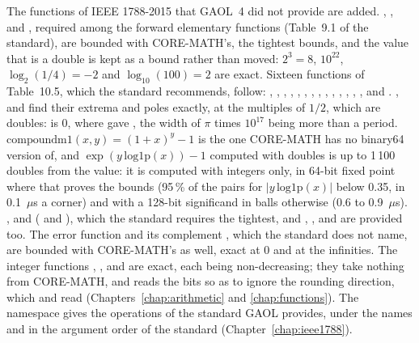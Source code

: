 \medskip
The functions of IEEE 1788-2015 that GAOL~4 did not provide are
added.\newinvfive{} , ,  and ,
required among the forward elementary functions (Table~9.1 of the standard),
are bounded with CORE-MATH's, the tightest bounds, and the value that is a
double is kept as a bound rather than moved: $2^3 = 8$, $10^{22}$,
$\log_2(1/4) = -2$ and $\log_{10}(100) = 2$ are exact. Sixteen functions of
Table~10.5, which the standard recommends, follow: ,
, , , , ,
, , , , ,
, , ,  and
. ,  and  find their
extrema and poles exactly, at the multiples of $1/2$, which are doubles:
 is 0, where  gave , the
width of $\pi$ times $10^{17}$ being more than a period.
$\mathrm{compoundm1}(x, y) = (1 + x)^y - 1$ is the one CORE-MATH has no
binary64 version of, and $\exp(y\,\mathrm{log1p}(x)) - 1$ computed with
doubles is up
to 1\,100 doubles from the value: it is computed with integers only, in
64-bit fixed point where that proves the bounds (95\,\% of the pairs for
$|y\,\mathrm{log1p}(x)|$ below 0.35, in 0.1~$\mu$s a corner) and with a 128-bit
significand in balls otherwise (0.6 to 0.9~$\mu$s). ,
 and  ( and
), which the standard requires the tightest, and
, ,  and 
are provided too. The error function  and
its complement , which the standard does not name, are bounded
with CORE-MATH's as well, exact at 0 and at the infinities. The integer
functions , ,  and
 are exact, each being non-decreasing; they take
nothing from CORE-MATH, and  reads the bits so as
to ignore the rounding direction, which  and
 read (Chapters~\ref{chap:arithmetic} and
\ref{chap:functions}). The namespace  gives the
operations of the standard GAOL provides, under the names and in the argument
order of the standard (Chapter~\ref{chap:ieee1788}).

